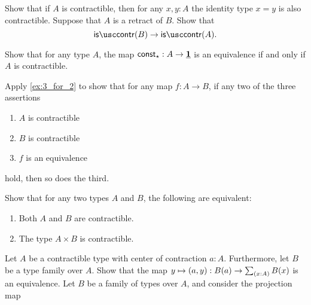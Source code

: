 \begin{exercises}
\exercise \label{ex:prop_contr}Show that if $A$ is contractible, then for any $x,y:A$ the identity type $x=y$ is also contractible.
\exercise \label{ex:contr_retr}Suppose that $A$ is a retract of $B$. Show that
  \begin{equation*}
    \iscontr(B)\to\iscontr(A).
  \end{equation*}
\exercise \label{ex:contr_equiv}
  \begin{subexenum}
  \item Show that for any type $A$, the map $\mathsf{const}_\star : A\to \underline{\mathbf{1}}$ is an equivalence if and only if $A$ is contractible.
  \item Apply \cref{ex:3_for_2} to show that for any map $f:A\to B$, if any two of the three assertions
    \begin{enumerate}
    \item $A$ is contractible
    \item $B$ is contractible
    \item $f$ is an equivalence
    \end{enumerate}
    hold, then so does the third.
  \end{subexenum}
\exercise Show that for any two types $A$ and $B$, the following are equivalent:
  \begin{enumerate}
  \item Both $A$ and $B$ are contractible.
  \item The type $A\times B$ is contractible.
  \end{enumerate}
\exercise \label{ex:contr_in_sigma} Let $A$ be a contractible type with center of contraction $a:A$. Furthermore, let $B$ be a type family over $A$. Show that the map $y\mapsto\pairr{a,y}:B(a)\to\sm{x:A}B(x)$ is an equivalence.
\exercise \label{ex:proj_fiber}Let $B$ be a family of types over $A$, and consider the projection map 
  \begin{equation*}

\end{equation*}
\end{exercises}
